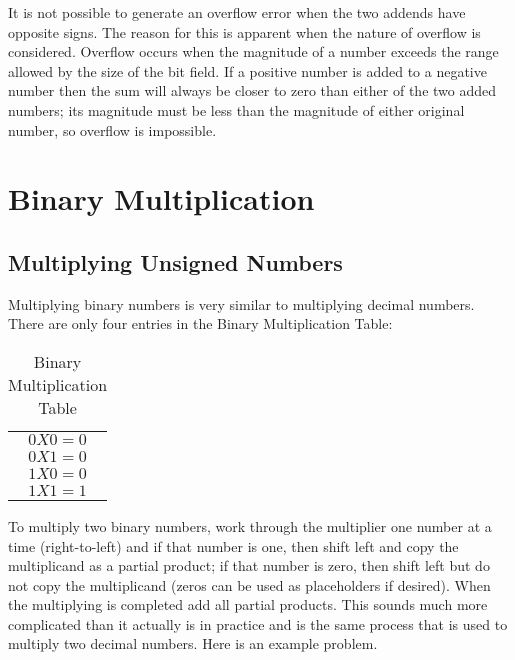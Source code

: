 It is not possible to generate an overflow error when the two addends have opposite signs. The reason for this is apparent when the nature of overflow is considered. Overflow occurs when the magnitude of a number exceeds the range allowed by the size of the bit field. If a positive number is added to a negative number then the sum will always be closer to zero than either of the two added numbers; its magnitude must be less than the magnitude of either original number, so overflow is impossible.

\section{Binary Multiplication}
\label{MO:sec:binary_multiplication}

\subsection{Multiplying Unsigned Numbers}
\label{MO:sub:multiplying_unsigned_numbers}

Multiplying binary numbers is very similar to multiplying decimal numbers. There are only four entries in the Binary Multiplication Table:

\begin{table}[H]
  \sffamily
  \newcommand{\head}[1]{\textcolor{white}{\textbf{#1}}}    
  \begin{center}
    \begin{tabular}{ c } 
      $ 0X0=0 $   \\
      $ 0X1=0 $   \\
      $ 1X0=0 $   \\
      $ 1X1=1 $
    \end{tabular}
  \end{center}
  \caption{Binary Multiplication Table}
  \label{MO:tab:binary_multiplication}
\end{table} 

To multiply two binary numbers, work through the multiplier one number at a time (right-to-left) and if that number is one, then shift left and copy the multiplicand as a partial product; if that number is zero, then shift left but do not copy the multiplicand (zeros can be used as placeholders if desired). When the multiplying is completed add all partial products. This sounds much more complicated than it actually is in practice and is the same process that is used to multiply two decimal numbers. Here is an example problem.

